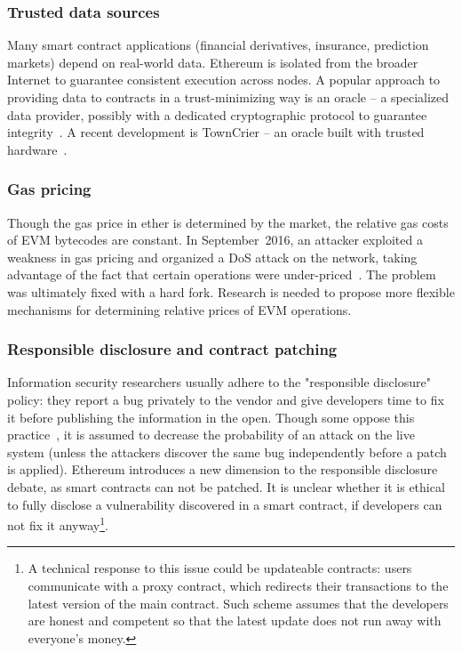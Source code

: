 \subsubsection*{Trusted data sources}
Many smart contract applications (financial derivatives, insurance, prediction markets) depend on real-world data.
Ethereum is isolated from the broader Internet to guarantee consistent execution across nodes.
A popular approach to providing data to contracts in a trust-minimizing way is an oracle -- a specialized data provider, possibly with a dedicated cryptographic protocol to guarantee integrity~\cite{Provable}.
A recent development is TownCrier -- an oracle built with trusted hardware~\cite{Zhang2016}.

\subsubsection*{Gas pricing}
Though the gas price in ether is determined by the market, the relative gas costs of EVM bytecodes are constant.
In September~2016, an attacker exploited a weakness in gas pricing and organized a DoS attack on the network, taking advantage of the fact that certain operations were under-priced~\cite{EIP150}.
The problem was ultimately fixed with a hard fork.
Research is needed to propose more flexible mechanisms for determining relative prices of EVM operations.

\subsubsection*{Responsible disclosure and contract patching}
Information security researchers usually adhere to the "responsible disclosure" policy: they report a bug privately to the vendor and give developers time to fix it before publishing the information in the open.
Though some oppose this practice~\cite{Schneier2007}, it is assumed to decrease the probability of an attack on the live system (unless the attackers discover the same bug independently before a patch is applied).
Ethereum introduces a new dimension to the responsible disclosure debate, as smart contracts can not be patched.
It is unclear whether it is ethical to fully disclose a vulnerability discovered in a smart contract, if developers can not fix it anyway\footnote{A technical response to this issue could be updateable contracts: users communicate with a proxy contract, which redirects their transactions to the latest version of the main contract. Such scheme assumes that the developers are honest and competent so that the latest update does not run away with everyone's money.}.

